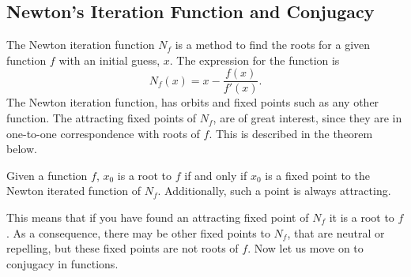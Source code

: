 \subsection{Newton's Iteration Function and Conjugacy}

The Newton iteration function $N_f$ is a method to find the roots for a given function $f$ with an initial guess, $x$. The expression for the function is 
\[N_f(x)=x-\frac{f(x)}{f'(x)}.\]
The Newton iteration function, has orbits and fixed points such as any other function. The attracting fixed points of $N_f$, are of great interest, since they are in one-to-one correspondence with roots of $f$. This is described in the theorem below. \parencite{yau}
\begin{theorem}
Given a function $f$, $x_0$ is a root to $f$ if and only if $x_0$ is a fixed point to the Newton iterated function of $N_f$. Additionally, such a point is always attracting.
\end{theorem}
This means that if you have found an attracting fixed point of $N_f$ it is a root to $f$. As a consequence, there may be other fixed points to $N_f$, that are neutral or repelling, but these fixed points are not roots of $f$.  
Now let us move on to conjugacy in functions.

